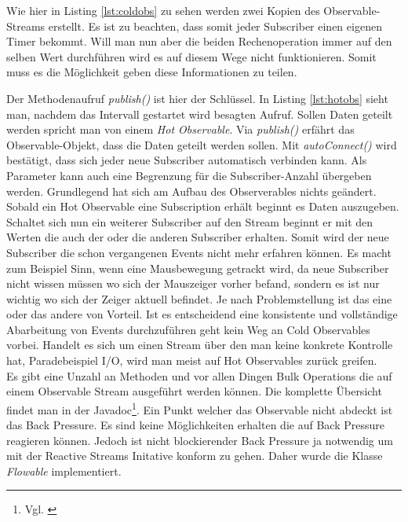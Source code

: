 
Wie hier in Listing \ref{lst:coldobs} zu sehen werden zwei Kopien des Observable-Streams erstellt. Es ist zu beachten, dass somit jeder Subscriber einen eigenen Timer bekommt. Will man nun aber die beiden Rechenoperation immer auf den selben Wert durchführen wird es auf diesem Wege nicht funktionieren. Somit muss es die Möglichkeit geben diese Informationen zu teilen.

Der Methodenaufruf \textit{publish()} ist hier der Schlüssel. In Listing \ref{lst:hotobs} sieht man, nachdem das Intervall gestartet wird besagten Aufruf. Sollen Daten geteilt werden spricht man von einem \textit{Hot Observable}. Via \textit{publish()} erfährt das Observable-Objekt, dass die Daten geteilt werden sollen. Mit \textit{autoConnect()} wird bestätigt, dass sich jeder neue Subscriber automatisch verbinden kann. Als Parameter kann auch eine Begrenzung für die Subscriber-Anzahl übergeben werden. Grundlegend hat sich am Aufbau des Observerables nichts geändert. Sobald ein Hot Observable eine Subscription erhält beginnt es Daten auszugeben. Schaltet sich nun ein weiterer Subscriber auf den Stream beginnt er mit den Werten die auch der oder die anderen Subscriber erhalten. Somit wird der neue Subscriber die schon vergangenen Events nicht mehr erfahren können. Es macht zum Beispiel Sinn, wenn eine Mausbewegung getrackt wird, da neue Subscriber nicht wissen müssen wo sich der Mauszeiger vorher befand, sondern es ist nur wichtig wo sich der Zeiger aktuell befindet. Je nach Problemstellung ist das eine oder das andere von Vorteil. Ist es entscheidend eine konsistente und vollständige Abarbeitung von Events durchzuführen geht kein Weg an Cold Observables vorbei. Handelt es sich um einen Stream über den man keine konkrete Kontrolle hat, Paradebeispiel I/O, wird man meist auf Hot Observables zurück greifen. \\ Es gibt eine Unzahl an Methoden und vor allen Dingen Bulk Operations die auf einem Observable Stream ausgeführt werden können. Die komplette Übersicht findet man in der Javadoc\footnote{Vgl. \cite{rx.javadoc}}. Ein Punkt welcher das Observable nicht abdeckt ist das Back Pressure. Es sind keine Möglichkeiten erhalten die auf Back Pressure reagieren können. Jedoch ist nicht blockierender Back Pressure ja notwendig um mit der Reactive Streams Initative konform zu gehen. Daher wurde die Klasse \textit{Flowable} implementiert.
